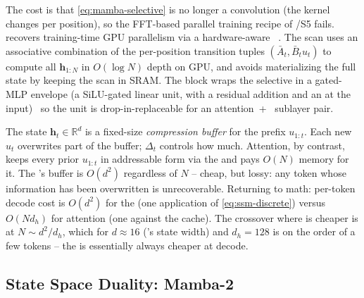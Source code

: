 The cost is that \eqref{eq:mamba-selective} is no longer a convolution
(the kernel changes per position), so the FFT-based parallel training
recipe of /S5 fails.  recovers training-time GPU parallelism via
a hardware-aware \emph{}~\citep[\S
3.3]{gu2023-mamba}. The scan uses an associative
combination of the per-position transition tuples
$(\bar{A}_t, \bar{B}_t u_t)$ to compute all
$\boldsymbol{h}_{1:N}$ in $O(\log N)$ depth on GPU, and avoids
materializing the full state by keeping the scan in SRAM. The 
block wraps the selective  in a gated-MLP envelope (a SiLU-gated
linear unit, with a residual addition and an  at the
input)~\citep[\S 3.4]{gu2023-mamba} so the unit is drop-in-replaceable
for an attention~+~ sublayer pair.

\begin{intuition}
The state $\boldsymbol{h}_t \in \mathbb{R}^d$ is a fixed-size
\emph{compression buffer} for the prefix $u_{1:t}$. Each new $u_t$
overwrites part of the buffer; $\Delta_t$ controls how much. Attention,
by contrast, keeps every prior $u_{1:t}$ in addressable form via the
 and pays $O(N)$ memory for it. The 's buffer is $O(d^2)$
regardless of $N$ -- cheap, but lossy: any token whose information has
been overwritten is unrecoverable. Returning to math: per-token decode
cost is $O(d^2)$ for the  (one application of \eqref{eq:ssm-discrete})
versus $O(N d_h)$ for attention (one  against the cache). The
crossover where  is cheaper is at $N \sim d^2 / d_h$, which for
$d \approx 16$ ('s state width) and $d_h = 128$ is on the order of
a few tokens -- the  is essentially always cheaper at decode.
\end{intuition}

\subsection{State Space Duality: Mamba-2}
\label{sec:ssm-mamba2}

